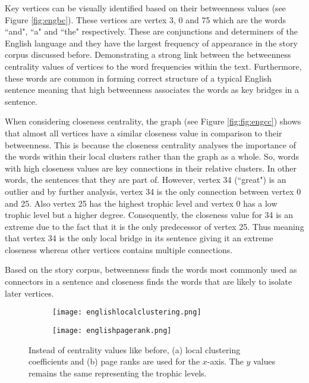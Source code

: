 Key vertices can be visually identified based on their betweenness values (see Figure \ref{fig:engbc}). These vertices are vertex 3, 0 and 75 which are the words ``and", ``a" and ``the" respectively. These are conjunctions and determiners of the English language and they have the largest frequency of appearance in the story corpus discussed before. Demonstrating a strong link between the betweenness centrality values of vertices to the word frequencies within the text. Furthermore, these words are common in forming correct structure of a typical English sentence meaning that high betweenness associates the words as key bridges in a sentence. 

When considering closeness centrality, the graph (see Figure \ref{fig:fig:engcc}) shows that almost all vertices have a similar closeness value in comparison to their betweenness. This is because the closeness centrality analyses the importance of the words within their local clusters rather than the graph as a whole. So, words with high closeness values are key connections in their relative clusters. In other words, the sentences that they are part of. However, vertex 34 (``great") is an outlier and by further analysis, vertex 34 is the only connection between vertex 0 and 25. Also vertex 25 has the highest trophic level and vertex 0 has a low trophic level but a higher degree. Consequently, the closeness value for 34 is an extreme due to the fact that it is the only predecessor of vertex 25. Thus meaning that vertex 34 is the only local bridge in its sentence giving it an extreme closeness whereas other vertices contains multiple connections.

Based on the story corpus, betweenness finds the words most commonly used as connectors in a sentence and closeness finds the words that are likely to isolate later vertices.

\begin{figure}[!htb]
\centering
\begin{subfigure}{.45\textwidth}
	\hspace{-1cm} 
	\texttt{[image: englishlocalclustering.png]}
	\caption{}
	\label{fig:englc}
\end{subfigure}
\hfill
\begin{subfigure}{.45\textwidth}
	\hspace{-1cm} 
	\texttt{[image: englishpagerank.png]}
	\caption{}
	\label{fig:engpr}
\end{subfigure}
\caption{Instead of centrality values like before, (a) local clustering coefficients and (b) page ranks are used for the $x$-axis. The $y$ values remains the same representing the trophic levels.}
\end{figure}

